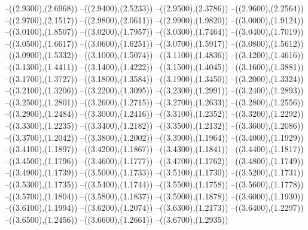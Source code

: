 {	--({\sx*(2.9300)},{\sy*(2.6968)})
	--({\sx*(2.9400)},{\sy*(2.5233)})
	--({\sx*(2.9500)},{\sy*(2.3786)})
	--({\sx*(2.9600)},{\sy*(2.2564)})
	--({\sx*(2.9700)},{\sy*(2.1517)})
	--({\sx*(2.9800)},{\sy*(2.0611)})
	--({\sx*(2.9900)},{\sy*(1.9820)})
	--({\sx*(3.0000)},{\sy*(1.9124)})
	--({\sx*(3.0100)},{\sy*(1.8507)})
	--({\sx*(3.0200)},{\sy*(1.7957)})
	--({\sx*(3.0300)},{\sy*(1.7464)})
	--({\sx*(3.0400)},{\sy*(1.7019)})
	--({\sx*(3.0500)},{\sy*(1.6617)})
	--({\sx*(3.0600)},{\sy*(1.6251)})
	--({\sx*(3.0700)},{\sy*(1.5917)})
	--({\sx*(3.0800)},{\sy*(1.5612)})
	--({\sx*(3.0900)},{\sy*(1.5332)})
	--({\sx*(3.1000)},{\sy*(1.5074)})
	--({\sx*(3.1100)},{\sy*(1.4836)})
	--({\sx*(3.1200)},{\sy*(1.4616)})
	--({\sx*(3.1300)},{\sy*(1.4411)})
	--({\sx*(3.1400)},{\sy*(1.4222)})
	--({\sx*(3.1500)},{\sy*(1.4045)})
	--({\sx*(3.1600)},{\sy*(1.3881)})
	--({\sx*(3.1700)},{\sy*(1.3727)})
	--({\sx*(3.1800)},{\sy*(1.3584)})
	--({\sx*(3.1900)},{\sy*(1.3450)})
	--({\sx*(3.2000)},{\sy*(1.3324)})
	--({\sx*(3.2100)},{\sy*(1.3206)})
	--({\sx*(3.2200)},{\sy*(1.3095)})
	--({\sx*(3.2300)},{\sy*(1.2991)})
	--({\sx*(3.2400)},{\sy*(1.2893)})
	--({\sx*(3.2500)},{\sy*(1.2801)})
	--({\sx*(3.2600)},{\sy*(1.2715)})
	--({\sx*(3.2700)},{\sy*(1.2633)})
	--({\sx*(3.2800)},{\sy*(1.2556)})
	--({\sx*(3.2900)},{\sy*(1.2484)})
	--({\sx*(3.3000)},{\sy*(1.2416)})
	--({\sx*(3.3100)},{\sy*(1.2352)})
	--({\sx*(3.3200)},{\sy*(1.2292)})
	--({\sx*(3.3300)},{\sy*(1.2235)})
	--({\sx*(3.3400)},{\sy*(1.2182)})
	--({\sx*(3.3500)},{\sy*(1.2132)})
	--({\sx*(3.3600)},{\sy*(1.2086)})
	--({\sx*(3.3700)},{\sy*(1.2042)})
	--({\sx*(3.3800)},{\sy*(1.2002)})
	--({\sx*(3.3900)},{\sy*(1.1964)})
	--({\sx*(3.4000)},{\sy*(1.1929)})
	--({\sx*(3.4100)},{\sy*(1.1897)})
	--({\sx*(3.4200)},{\sy*(1.1867)})
	--({\sx*(3.4300)},{\sy*(1.1841)})
	--({\sx*(3.4400)},{\sy*(1.1817)})
	--({\sx*(3.4500)},{\sy*(1.1796)})
	--({\sx*(3.4600)},{\sy*(1.1777)})
	--({\sx*(3.4700)},{\sy*(1.1762)})
	--({\sx*(3.4800)},{\sy*(1.1749)})
	--({\sx*(3.4900)},{\sy*(1.1739)})
	--({\sx*(3.5000)},{\sy*(1.1733)})
	--({\sx*(3.5100)},{\sy*(1.1730)})
	--({\sx*(3.5200)},{\sy*(1.1731)})
	--({\sx*(3.5300)},{\sy*(1.1735)})
	--({\sx*(3.5400)},{\sy*(1.1744)})
	--({\sx*(3.5500)},{\sy*(1.1758)})
	--({\sx*(3.5600)},{\sy*(1.1778)})
	--({\sx*(3.5700)},{\sy*(1.1804)})
	--({\sx*(3.5800)},{\sy*(1.1837)})
	--({\sx*(3.5900)},{\sy*(1.1878)})
	--({\sx*(3.6000)},{\sy*(1.1930)})
	--({\sx*(3.6100)},{\sy*(1.1994)})
	--({\sx*(3.6200)},{\sy*(1.2074)})
	--({\sx*(3.6300)},{\sy*(1.2173)})
	--({\sx*(3.6400)},{\sy*(1.2297)})
	--({\sx*(3.6500)},{\sy*(1.2456)})
	--({\sx*(3.6600)},{\sy*(1.2661)})
	--({\sx*(3.6700)},{\sy*(1.2935)})
}
